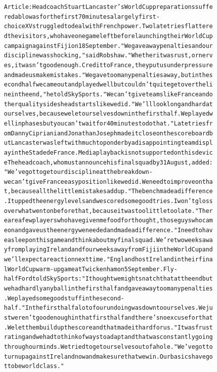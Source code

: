 \begin{figure}[t]
{{\begin{alltt}
Article: Head coach Stuart Lancaster's World Cup preparations suffered a blow as for the first 70 minutes a largely first-choice XV struggled to deal with French power. Two late tries flattered the visitors, who have one game left before launching their World Cup campaign against Fiji on 18 September. "We gave away penalties and our discipline was shocking," said Robshaw. "Whether it was rust, or nerves, it wasn't good enough. Credit to France, they put us under pressure and made us make mistakes. "We gave too many penalties away, but in the second half we came out and played well but couldn't quite get over the line in the end," he told Sky Sports. "We can't give teams like France and other quality sides head starts like we did. "We'll look long and hard at ourselves, because we let ourselves down in the first half. We played well in phases but you can't wait for 40 minutes to do that." Late tries from Danny Cipriani and Jonathan Joseph made it close on the scoreboard but Lancaster was left with much to ponder by a disappointing team display in the Stade de France. Media playback is not supported on this device The head coach, who must announce his final squad by 31 August, added: "We've got to get our discipline at the breakdown - we can't give France easy position like we did. We need to improve on that, because all the little mistakes add up. "The bench made a difference. It upped the energy levels and we scored some good tries. I won't gloss over what went on before that, because it was too little too late. "There are a few players who have given me food for thought, those guys who came on and gave us the energy we needed and made a difference. "I need to have a sleep on this game and think about my final squad. We're two weeks away from playing Ireland and four weeks away from Fiji in the World Cup and we'll expect a reaction next time." England host Ireland in their final World Cup warm-up game at Twickenham on 5 September. Fly-half Ford told Sky Sports: "I thought we might snatch that at the end but we had hardly any ball in the first half and gave away too many penalties. We played some good stuff in the second-half. "In the first half a lot of our undoing was down to ourselves. We just weren't good enough in that first half and there's no excuse for that. We let them build up the score and that made it hard for us. "It was frustrating and we had to think of ways to adapt and that was constantly going through our minds. We tried to get ourselves out of a hole. "We've got to turn up against Ireland now and make sure that we win. Our basics have got to be world class."


\end{alltt}}}
\end{figure}

